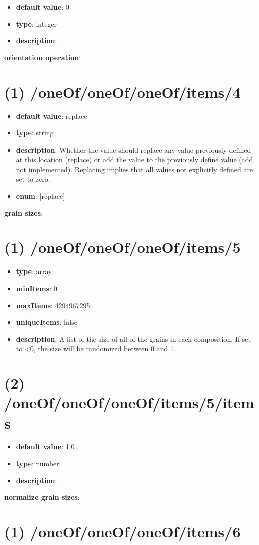 \begin{itemize}[leftmargin=2em]\item {\bf default value}: 0
\item {\bf type}: integer
\item {\bf description}: 
\end{itemize}\item {\bf orientation operation}: \section{(1) /oneOf/oneOf/oneOf/items/4}
\begin{itemize}[leftmargin=1em]\item {\bf default value}: replace
\item {\bf type}: string
\item {\bf description}: Whether the value should replace any value previously defined at this location (replace) or add the value to the previously define value (add, not implemented). Replacing implies that all values not explicitly defined are set to zero.
\item {\bf enum}: [replace]\end{itemize}\item {\bf grain sizes}: \section{(1) /oneOf/oneOf/oneOf/items/5}
\begin{itemize}[leftmargin=1em]\item {\bf type}: array
\item {\bf minItems}: 0
\item {\bf maxItems}: 4294967295
\item {\bf uniqueItems}: false
\item {\bf description}: A list of the size of all of the grains in each composition. If set to <0, the size will be randomized between 0 and 1.
\end{itemize}\section{(2) /oneOf/oneOf/oneOf/items/5/items}
\begin{itemize}[leftmargin=2em]\item {\bf default value}: 1.0
\item {\bf type}: number
\item {\bf description}: 
\end{itemize}\item {\bf normalize grain sizes}: \section{(1) /oneOf/oneOf/oneOf/items/6}
